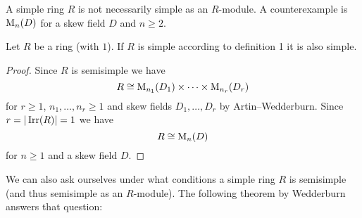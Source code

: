 \begin{warning}
  A simple ring $R$ is not necessarily simple as an $R$-module.
  A counterexample is $\operatorname{M}_n(D)$ for a skew field $D$ and $n \geq 2$.
\end{warning}


\begin{lemma}
  Let $R$ be a ring (with $1$).
  If $R$ is simple according to definition 1 it is also simple.
\end{lemma}
\begin{proof}
  Since $R$ is semisimple we have
  \[
    R \cong \operatorname{M}_{n_1}(D_1) \times \dotsb \times \operatorname{M}_{n_r}(D_r)
  \]
  for $r \geq 1$, $n_1, \dotsc, n_r \geq 1$ and skew fields $D_1, \dotsc, D_r$ by Artin--Wedderburn.
  Since $r = |\operatorname{Irr}(R)| = 1$ we have
  \[
    R \cong \operatorname{M}_n(D)
  \]
  for $n \geq 1$ and a skew field $D$.
\end{proof}


We can also ask ourselves under what conditions a simple ring $R$ is semisimple (and thus semisimple as an $R$-module). The following theorem by Wedderburn answers that question:



